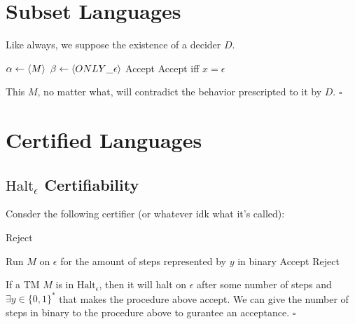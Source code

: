 \documentclass[12pt]{article}
\begin{document}
\pagebreak

\section{Subset Languages}

Like always, we suppose the existence of a decider $D$.
\begin{algorithmic}[1]
        \State $\alpha \gets \braket{M}$
        \State $\beta \gets \braket{ONLY\_\epsilon}$
            \State Accept
        \Else
            \State Accept iff $x=\epsilon$
        \EndIf
    \EndProcedure
\end{algorithmic}
This $M$, no matter what, will contradict the behavior prescripted to it by $D$. $\square$

\section{Certified Languages}

\subsection{\texorpdfstring{$\text{Halt}_\epsilon$}{Halt\_e} Certifiability}

Consder the following certifier (or whatever idk what it's called):
\begin{algorithmic}[1]
            \State Reject
        \EndIf

        \item[]
        \State Run $M$ on $\epsilon$ for the amount of steps represented by $y$ in binary
            \State Accept
        \Else
            \State Reject
        \EndIf
    \EndProcedure
\end{algorithmic}

If a TM $M$ is in $\text{Halt}_\epsilon$, then it will halt on $\epsilon$ after some
number of steps and $\exists y \in \{0, 1\}^*$ that makes the procedure above accept.
We can give the number of steps in binary to the procedure above to gurantee an acceptance. $\square$
\end{document}
